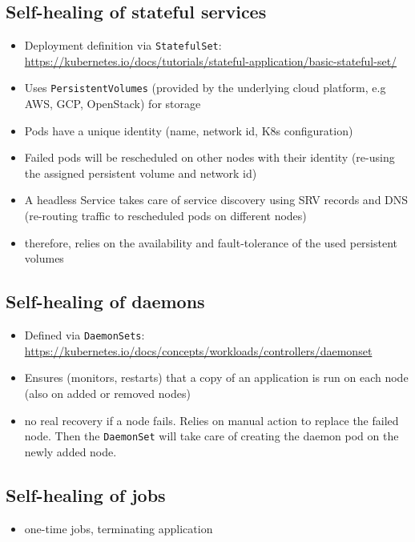   \subsection{Self-healing of stateful services}
    \begin{itemize}
      \item Deployment definition via \texttt{StatefulSet}: \url{https://kubernetes.io/docs/tutorials/stateful-application/basic-stateful-set/}
      \item  Uses \texttt{PersistentVolumes} (provided by the underlying cloud platform, e.g AWS, GCP, OpenStack) for storage
      \item Pods have a unique identity (name, network id, K8s configuration)
      \item Failed pods will be rescheduled on other nodes with their identity (re-using the assigned persistent volume and network id)
      \item A headless Service takes care of service discovery using SRV records and DNS (re-routing traffic to rescheduled pods on different nodes)
      \item therefore, relies on the availability and fault-tolerance of the used persistent volumes
    \end{itemize}

  \subsection{Self-healing of daemons}
    \begin{itemize}
      \item Defined via \texttt{DaemonSets}: \url{https://kubernetes.io/docs/concepts/workloads/controllers/daemonset}
      \item Ensures (monitors, restarts) that a copy of an application is run on each node (also on added or removed nodes)
      \item no real recovery if a node fails. Relies on manual action to replace the failed node. Then the \texttt{DaemonSet} will take care of creating the daemon pod on the newly added node.
    \end{itemize}

  \subsection{Self-healing of jobs}
    \begin{itemize}
      \item one-time jobs, terminating application
    \end{itemize}

